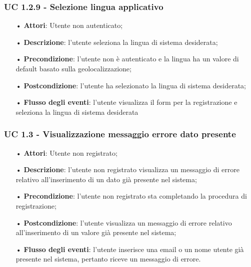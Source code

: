 \subsubsection{UC 1.2.9 - Selezione lingua applicativo}
\begin{itemize}
	\item[•]\textbf{Attori}: Utente non autenticato;
	\item[•]\textbf{Descrizione}: l'utente seleziona la lingua di sistema desiderata;
	\item[•]\textbf{Precondizione}: l'utente non è autenticato e la lingua ha un valore di default basato sulla geolocalizzazione;
	\item[•]\textbf{Postcondizione}: l'utente ha selezionato la lingua di sistema desiderata;
	\item[•]\textbf{Flusso degli eventi}: l'utente visualizza il form per la registrazione e seleziona la lingua di sistema desiderata 
\end{itemize}

\subsubsection{UC 1.3 - Visualizzazione messaggio errore dato presente}
\begin{itemize}
	\item[•]\textbf{Attori}: Utente non registrato;
	\item[•]\textbf{Descrizione}: l'utente non registrato visualizza un messaggio di errore relativo all'inserimento
	di un dato già presente nel sistema;
	\item[•]\textbf{Precondizione}: l'utente non registrato sta completando la procedura di registrazione;
	\item[•]\textbf{Postcondizione}: l'utente visualizza un messaggio di errore relativo all'inserimento di un valore già presente nel sistema;
	\item[•]\textbf{Flusso degli eventi}: l'utente inserisce una email o un nome utente già presente nel sistema, pertanto riceve un messaggio di errore.
\end{itemize}

